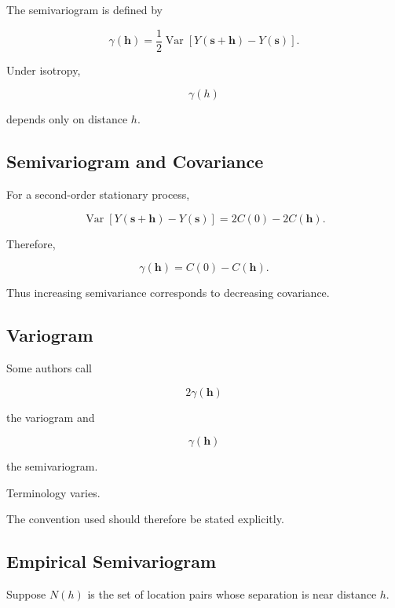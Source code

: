 The semivariogram is defined by

\[
\boxed{
\gamma(\mathbf{h})
=
\frac12
\operatorname{Var}
\left[
Y(\mathbf{s}+\mathbf{h})
-
Y(\mathbf{s})
\right].
}
\]

Under isotropy,

\[
\boxed{
\gamma(h)
}
\]

depends only on distance \(h\).

\subsection{Semivariogram and Covariance}
\label{subsec:semivariogram-covariance}

For a second-order stationary process,

\[
\operatorname{Var}
[
Y(\mathbf{s}+\mathbf{h})
-
Y(\mathbf{s})
]
=
2C(0)-2C(\mathbf{h}).
\]

Therefore,

\[
\boxed{
\gamma(\mathbf{h})
=
C(0)-C(\mathbf{h}).
}
\]

Thus increasing semivariance corresponds to decreasing covariance.

\subsection{Variogram}
\label{subsec:variogram}

Some authors call

\[
\boxed{
2\gamma(\mathbf{h})
}
\]

the variogram and

\[
\gamma(\mathbf{h})
\]

the semivariogram.

Terminology varies.

The convention used should therefore be stated explicitly.

\subsection{Empirical Semivariogram}
\label{subsec:empirical-semivariogram}

Suppose \(N(h)\) is the set of location pairs whose separation is near
distance \(h\).

